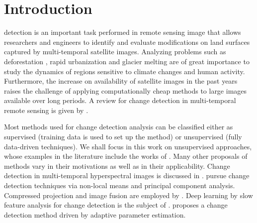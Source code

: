 \documentclass[journal]{IEEEtran}
\begin{document}
%
\IEEEpeerreviewmaketitle



\section{Introduction}
% 
% 
% 
% 

 detection is an important task performed in remote sensing image that allows researchers and engineers to identify and evaluate modifications on land surfaces captured by multi-temporal satellite images. Analyzing problems such as deforestation \cite{barreto2016deforestation}, rapid urbanization \cite{ban2012multitemporal} and glacier melting \cite{scher2021mapping} are of great importance to study the dynamics of regions sensitive to climate changes and human activity. Furthermore, the increase on availability of satellite images in the past years raises the challenge of applying computationally cheap methods to large images available over long periods. A review for change detection in multi-temporal remote sensing is given by \cite{ban2016change}.


Most methods used for change detection analysis can be classified either as supervised (training data is used to set up the method) or unsupervised (fully data-driven techniques). We shall focus in this work on unsupervised approaches, whose examples in the literature include the works of \cite{bruzzone2000automatic,celik2010change,quin2014mimosa,saha2020change,NegriEA2021,NegriFrery2021}. Many other proposals of methods vary in their motivations as well as in their applicability.  Change detection in multi-temporal hyperspectral images is discussed in \cite{bovolo2015time,liu2019review,matsunaga2017current}.  \cite{jia2018novel} pursue change detection techniques via non-local means and principal component analysis. Compressed projection and image fusion are employed by \cite{hou2014unsupervised}. Deep learning by slow feature analysis for change detection is the subject of \cite{du2019unsupervised}. \cite{chen2020change} proposes a change detection method driven by adaptive parameter estimation.
\end{document}
